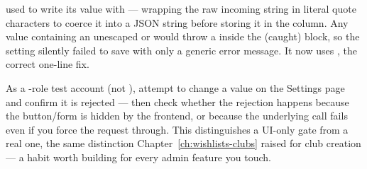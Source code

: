 \begin{olknote}
 used to write its value with  — wrapping the raw incoming string in literal quote characters to coerce it into a JSON string before storing it in the  column. Any value containing an unescaped  or \code{\textbackslash} would throw a  inside the (caught)  block, so the setting silently failed to save with only a generic error message. It now uses , the correct one-line fix.
\end{olknote}

\begin{olktask}
As a -role test account (not ), attempt to change a value on the Settings page and confirm it is rejected — then check whether the rejection happens because the button/form is hidden by the frontend, or because the underlying  call fails  even if you force the request through. This distinguishes a UI-only gate from a real one, the same distinction Chapter~\ref{ch:wishlists-clubs} raised for club creation — a habit worth building for every admin feature you touch.
\end{olktask}
